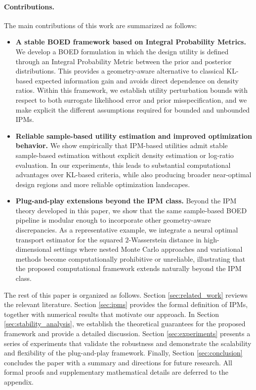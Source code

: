 \documentclass[twoside,11pt]{article}
\begin{document}
\paragraph{Contributions.} The main contributions of this work are summarized as follows:
\begin{itemize}
    \item \textbf{A stable BOED framework based on Integral Probability Metrics.}
    We develop a BOED formulation in which the design utility is defined through an Integral Probability Metric between the prior and posterior distributions. This provides a geometry-aware alternative to classical KL-based expected information gain and avoids direct dependence on density ratios. Within this framework, we establish utility perturbation bounds with respect to both surrogate likelihood error and prior misspecification, and we make explicit the different assumptions required for bounded and unbounded IPMs.
    \item \textbf{Reliable sample-based utility estimation and improved optimization behavior.}
    We show empirically that IPM-based utilities admit stable sample-based estimation without explicit density estimation or log-ratio evaluation. In our experiments, this leads to substantial computational advantages over KL-based criteria, while also producing broader near-optimal design regions and more reliable optimization landscapes.
    \item \textbf{Plug-and-play extensions beyond the IPM class.}
    Beyond the IPM theory developed in this paper, we show that the same sample-based BOED pipeline is modular enough to incorporate other geometry-aware discrepancies. As a representative example, we integrate a neural optimal transport estimator for the squared $2$-Wasserstein distance in high-dimensional settings where nested Monte Carlo approaches and variational methods become computationally prohibitive or unreliable, illustrating that the proposed computational framework extends naturally beyond the IPM class.
\end{itemize}

The rest of this paper is organized as follows. Section \ref{sec:related_work} reviews the relevant literature. Section \ref{sec:ipms} provides the formal definition of IPMs, together with numerical results that motivate our approach. In Section \ref{sec:stability_analysis}, we establish the theoretical guarantees for the proposed framework and provide a detailed discussion. Section \ref{sec:experiments} presents a series of experiments that validate the robustness and demonstrate the scalability and flexibility of the plug-and-play framework. Finally, Section \ref{sec:conclusion} concludes the paper with a summary and directions for future research. All formal proofs and supplementary mathematical details are deferred to the appendix.
\end{document}
